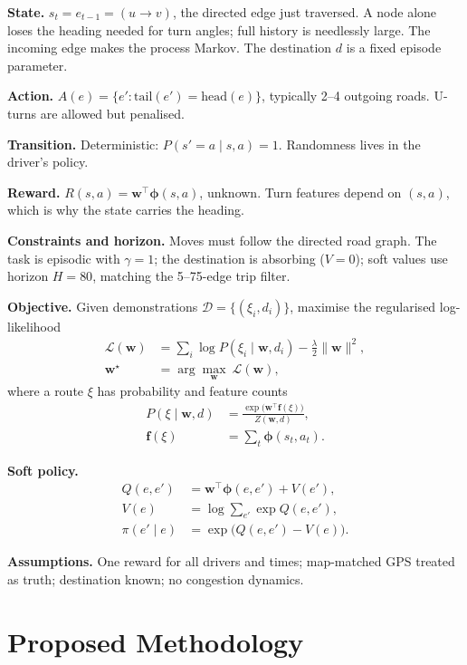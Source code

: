 \documentclass{ieeeaccess}
\newcommand{\bphi}{\boldsymbol{\phi}}
\newcommand{\bw}{\mathbf{w}}
\begin{document}
\textbf{State.} $s_t=e_{t-1}=(u\!\rightarrow\! v)$, the directed edge just traversed. A node alone loses the heading needed for turn angles; full history is needlessly large. The incoming edge makes the process Markov. The destination $d$ is a fixed episode parameter.

\textbf{Action.} $A(e)=\{e':\mathrm{tail}(e')=\mathrm{head}(e)\}$, typically 2--4 outgoing roads. U-turns are allowed but penalised.

\textbf{Transition.} Deterministic: $P(s'{=}a\mid s,a)=1$. Randomness lives in the driver's policy.

\textbf{Reward.} $R(s,a)=\bw^\top\bphi(s,a)$, unknown. Turn features depend on $(s,a)$, which is why the state carries the heading.

\textbf{Constraints and horizon.} Moves must follow the directed road graph. The task is episodic with $\gamma=1$; the destination is absorbing ($V=0$); soft values use horizon $H=80$, matching the 5--75-edge trip filter.

\textbf{Objective.} Given demonstrations $\mathcal D=\{(\xi_i,d_i)\}$, maximise the regularised log-likelihood
\begin{align}
\mathcal L(\bw) &= \sum_{i}\log P(\xi_i\mid\bw,d_i)-\frac{\lambda}{2}\|\bw\|^2,\\
\bw^\star &= \arg\max_{\bw}\ \mathcal L(\bw),
\end{align}
where a route $\xi$ has probability and feature counts
\begin{align}
P(\xi\mid\bw,d) &= \frac{\exp\big(\bw^\top\mathbf f(\xi)\big)}{Z(\bw,d)},\\
\mathbf f(\xi) &= \sum_{t}\bphi(s_t,a_t).
\end{align}

\textbf{Soft policy.}
\begin{align}
Q(e,e') &= \bw^\top\bphi(e,e')+V(e'),\\
V(e) &= \log\sum_{e'}\exp Q(e,e'),\\
\pi(e'\mid e) &= \exp\big(Q(e,e')-V(e)\big).
\end{align}

\textbf{Assumptions.} One reward for all drivers and times; map-matched GPS treated as truth; destination known; no congestion dynamics.

\section{Proposed Methodology}\label{sec:method}
\end{document}
